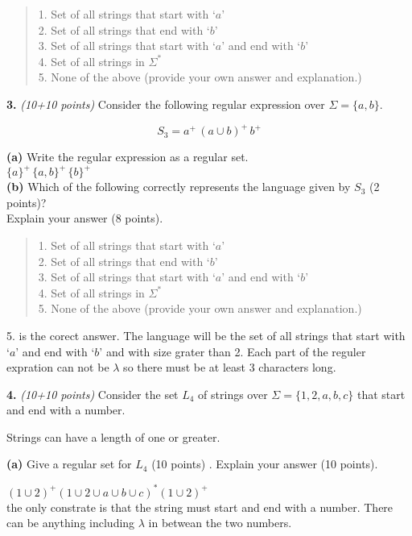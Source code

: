\documentclass[12pt]{article}
\begin{document}
\begin{quote}
1. Set of all strings that start with `$a$'
\\
2. Set of all strings that end with `$b$'
\\
3. Set of all strings that start with `$a$' and end with `$b$'
\\
4. Set of all strings in $\Sigma^*$
\\
5. None of the above (provide your own answer and explanation.)
\end{quote}

\newpage
{\bf 3.} {\em (10+10 points)}
Consider the following regular expression over $\Sigma=\{a,b\}$.

\[
S_3 = a^+ \, (a \cup b )^+  \, b^+
\]

{\bf (a)} Write the regular expression as a regular set.\\
$ \{a\}^+ \, \{a , b\}^+  \, \{b\}^+$\\
{\bf (b)} Which of the following correctly represents the language given by
$S_3$ (2 points)?
\\
Explain your answer (8 points).

\begin{quote}
1. Set of all strings that start with `$a$'
\\
2. Set of all strings that end with `$b$'
\\
3. Set of all strings that start with `$a$' and end with `$b$'
\\
4. Set of all strings in $\Sigma^*$
\\
5. None of the above (provide your own answer and explanation.)
\end{quote}

5. is the corect answer. The language will be the set of all strings that start with `$a$' and end with `$b$' and with size grater than 2. Each part of the reguler expration can not be $\lambda$ so there must be at least 3 characters long.

{\bf 4.} {\em (10+10 points)}
Consider the set $L_4$ of strings over
$\Sigma = \{ 1, 2, a, b, c \}$ that
 start and end with a number.

Strings can have a length of one or greater.

{\bf (a)} Give a regular set for $L_4$ (10 points) . Explain your answer (10 points).

$(1\cup2)^+(1\cup 2\cup a\cup b\cup c )^* (1\cup2)^+$\\
the only constrate is that the string must start and end with a number. There can be anything including $\lambda$ in betwean the two numbers.  
\end{document}
